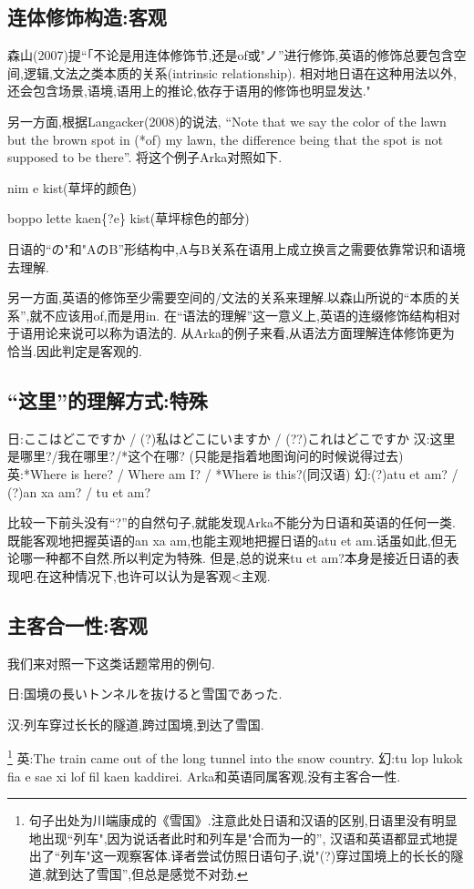 \subsection{连体修饰构造:客观}

森山(2007)提``「不论是用连体修饰节,还是of或"ノ''进行修饰,英语的修饰总要包含空间,逻辑,文法之类本质的关系(intrinsic relationship).
相对地日语在这种用法以外,还会包含场景,语境,语用上的推论,依存于语用的修饰也明显发达."

另一方面,根据Langacker(2008)的说法,
“Note that we say the color of the lawn but the brown spot in (*of) my lawn, 
the difference being that the spot is not supposed to be there”.
将这个例子Arka对照如下.

nim e kist(草坪的颜色)

boppo lette kaen\{?e\} kist(草坪棕色的部分)

日语的``の"和"AのB''形结构中,A与B关系在语用上成立换言之需要依靠常识和语境去理解.

另一方面,英语的修饰至少需要空间的/文法的关系来理解.以森山所说的``本质的关系'',就不应该用of,而是用in.
在“语法的理解”这一意义上,英语的连缀修饰结构相对于语用论来说可以称为语法的.
从Arka的例子来看,从语法方面理解连体修饰更为恰当.因此判定是客观的.

\subsection{``这里''的理解方式:特殊}

日:ここはどこですか / (?)私はどこにいますか / (??)これはどこですか
汉:这里是哪里?/我在哪里?/*这个在哪?	(只能是指着地图询问的时候说得过去)
英:*Where is here? / Where am I? / *Where is this?(同汉语)
幻:(?)atu et am? / (?)an xa am? / tu et am?

比较一下前头没有``?''的自然句子,就能发现Arka不能分为日语和英语的任何一类.
既能客观地把握英语的an xa am,也能主观地把握日语的atu et am.话虽如此,但无论哪一种都不自然.所以判定为特殊.
但是,总的说来tu et am?本身是接近日语的表现吧.在这种情况下,也许可以认为是客观<主观.
\subsection{主客合一性:客观}

我们来对照一下这类话题常用的例句.
{\kaishu
日:国境の長いトンネルを抜けると雪国であった.

汉:列车穿过长长的隧道,跨过国境,到达了雪国.}
\footnote{句子出处为川端康成的《雪国》.注意此处日语和汉语的区别,日语里没有明显地出现``列车",因为说话者此时和列车是"合而为一的'',
汉语和英语都显式地提出了``列车"这一观察客体.译者尝试仿照日语句子,说"(?)穿过国境上的长长的隧道,就到达了雪国'',但总是感觉不对劲.
}
{\kaishu
英:The train came out of the long tunnel into the snow country.
幻:tu lop lukok fia e sae xi lof fil kaen kaddirei.
}
Arka和英语同属客观,没有主客合一性.

